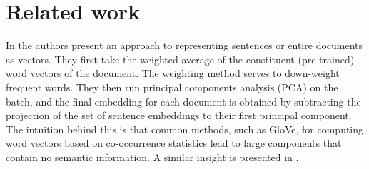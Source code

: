 \section{Related work}
In  the authors present an approach to representing sentences or entire documents as vectors. They first take the weighted average of the constituent (pre-trained) word vectors of the document. The weighting method serves to down-weight frequent words. They then run principal components analysis (PCA) on the batch, and the final embedding for each document is obtained by subtracting the projection of the set of sentence embeddings to their first principal component. The intuition behind this is that common methods, such as GloVe, for computing word vectors based on co-occurrence statistics lead to large components that contain no semantic information. A similar insight is presented in .